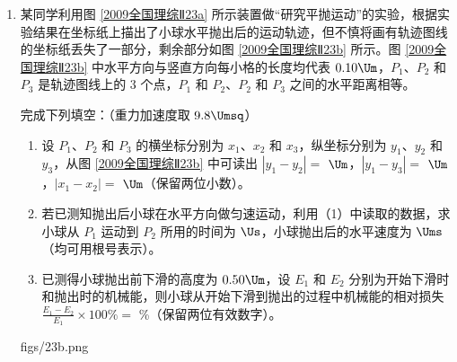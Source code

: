 \documentclass[\gkver]{gaokaozhenti}
\begin{document}
\begin{enumerate}
\item
某同学利用图 \ref{2009全国理综Ⅱ23a} 所示装置做“研究平抛运动”的实验，根据实验结果在坐标纸上描出了小球水平抛出后的运动轨迹，但不慎将画有轨迹图线的坐标纸丢失了一部分，剩余部分如图 \ref{2009全国理综Ⅱ23b} 所示。图 \ref{2009全国理综Ⅱ23b} 中水平方向与竖直方向每小格的长度均代表 $0.10\Um$，$P_{1}$、$P_{2}$ 和 $P_{3}$ 是轨迹图线上的 3 个点，$P_{1}$ 和 $P_{2}$、$P_{2}$ 和 $P_{3}$ 之间的水平距离相等。

完成下列填空：（重力加速度取 $9.8\Umsq$）
\begin{enumerate}
	\item
	设 $P_{1}$、$P_{2}$ 和 $P_{3}$ 的横坐标分别为 $x_{1}$、$x_{2}$ 和 $x_{3}$，纵坐标分别为 $y_{1}$、$y_{2}$ 和 $y_{3}$，从图 \ref{2009全国理综Ⅱ23b} 中可读出 $|y_{1}-y_{2}|=$ \tkanswer[1.6cm]{} $\Um$，$|y_{1}-y_{3}|=$ \tkanswer[1.6cm]{} $\Um$，$|x_{1}-x_{2}|=$ \tkanswer[1.6cm]{} $\Um$（保留两位小数）。
	\item
	若已测知抛出后小球在水平方向做匀速运动，利用（1）中读取的数据，求小球从 $P_{1}$ 运动到 $P_{2}$ 所用的时间为 \tkanswer[1.4cm]{} $\Us$，小球抛出后的水平速度为 \tkanswer[1.6cm]{} $\Ums$（均可用根号表示）。
	\item
	已测得小球抛出前下滑的高度为 $0.50\Um$，设 $E_{1}$ 和 $E_{2}$ 分别为开始下滑时和抛出时的机械能，则小球从开始下滑到抛出的过程中机械能的相对损失 $\frac{E_{1}-E_{2}}{E_{1}}\times100\%=$ \tkanswer[1.4cm]{}\%（保留两位有效数字）。
\end{enumerate}
{figs/23b.png}


\end{enumerate}
\end{document}
